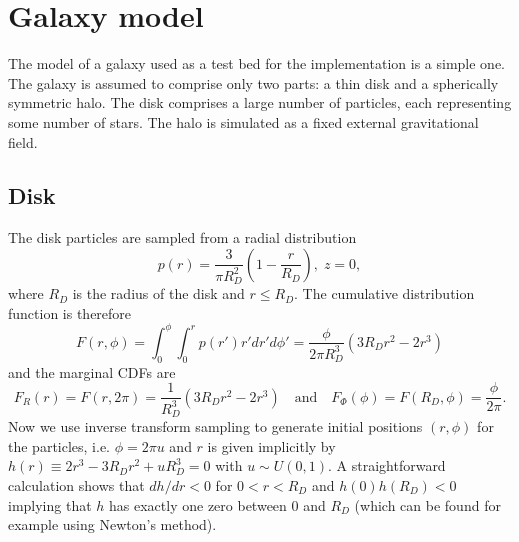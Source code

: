 \section{Galaxy model}
The model of a galaxy used as a test bed for the implementation is a simple one.
The galaxy is assumed to comprise only two parts: a thin disk and a spherically symmetric halo.
The disk comprises a large number of particles, each representing some number of stars.
The halo is simulated as a fixed external gravitational field.

\subsection{Disk}
The disk particles are sampled from a radial distribution
\begin{equation*}
    p(r) = \frac{3}{\pi R_D^2}\left(1 - \frac{r}{R_D}\right), \; z = 0,
\end{equation*}
where $R_D$ is the radius of the disk and $r \leq R_D$.
The cumulative distribution function is therefore
\begin{equation*}
    F(r, \phi) = \int_{0}^{\phi}\int_{0}^{r} p(r') r'dr'd\phi' = \frac{\phi}{2\pi R_D^3}(3R_D r^2-2r^3)
\end{equation*}
and the marginal CDFs are
\begin{equation*}
    F_R(r) = F(r, 2\pi) = \frac{1}{R_D^3}(3R_D r^2-2r^3) \quad \text{and} \quad F_\Phi(\phi) = F(R_D, \phi) = \frac{\phi}{2\pi}.
\end{equation*}
Now we use inverse transform sampling to generate initial positions $(r, \phi)$ for the particles, i.e. $\phi = 2\pi u$ and $r$ is given implicitly by $h(r) \equiv 2r^3 - 3R_D r^2 + uR_D^3 = 0$ with $u \sim U(0, 1)$.
A straightforward calculation shows that $dh/dr < 0$ for $0 < r < R_D$ and $h(0)h(R_D) < 0$ implying that $h$ has exactly one zero between 0 and $R_D$ (which can be found for example using Newton's method).

